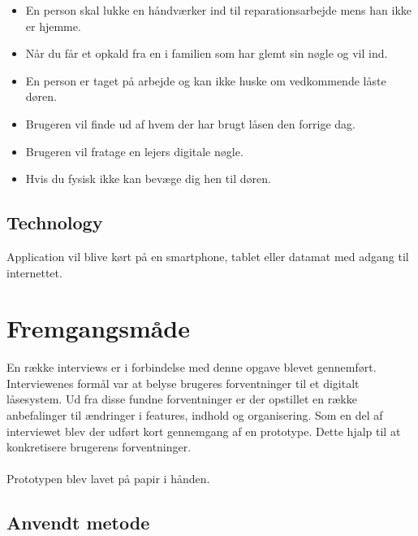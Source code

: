 \documentclass[a4paper,12pt]{article}
\begin{document}
\begin{itemize}
    \item En person skal lukke en håndværker ind til reparationsarbejde mens han
ikke er hjemme.
    \item Når du får et opkald fra en i familien som har glemt sin nøgle og vil ind.
    \item En person er taget på arbejde og kan ikke huske om vedkommende låste døren.
    \item Brugeren vil finde ud af hvem der har brugt låsen den forrige dag.
    \item Brugeren vil fratage en lejers digitale nøgle.
    \item Hvis du fysisk ikke kan bevæge dig hen til døren.
\end{itemize}

\subsection{Technology}
Application vil blive kørt på en smartphone, tablet eller datamat med adgang til internettet.



\section{Fremgangsmåde}

En række interviews er i forbindelse med denne opgave blevet gennemført. Interviewenes formål
var at belyse brugeres forventninger til et digitalt låsesystem. Ud fra disse fundne
forventninger er der opstillet en række anbefalinger til ændringer i features, indhold og
organisering. Som en del af interviewet blev der udført kort gennemgang af en prototype. Dette
hjalp til at konkretisere brugerens forventninger.
\\ \\
Prototypen blev lavet på papir i hånden.

\subsection{Anvendt metode}
\end{document}
